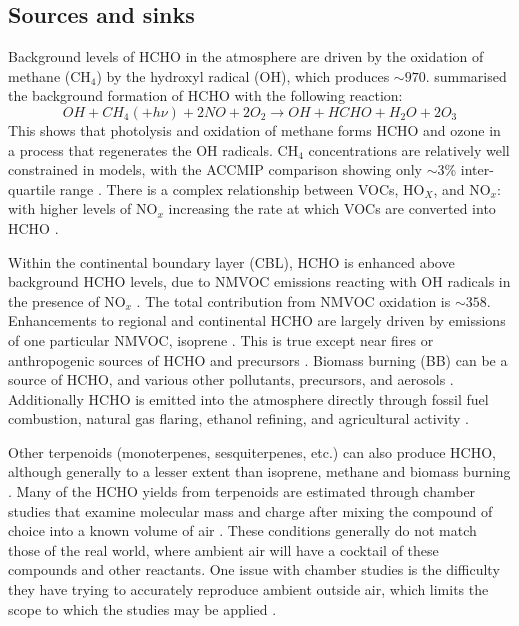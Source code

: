   
  \subsection{Sources and sinks}
    \label{LR:HCHO:Sources}
     
    Background levels of HCHO in the atmosphere are driven by the oxidation of methane (CH$_4$) by the hydroxyl radical (OH$\dot{}$), which produces $\sim 970$\tgpyr \parencite{FortemsCheiney2012}.
    \textcite{Atkinson2000} summarised the background formation of HCHO with the following reaction:
    \begin{equation*} \label{LR:HCHO:Sources:eqn_MethaneBackground}
      OH + CH_4 (+ h\nu) + 2NO + 2O_2 \rightarrow OH + HCHO + H_2O + 2O_3
    \end{equation*}
    This shows that photolysis and oxidation of methane forms HCHO and ozone in a process that regenerates the OH radicals.
    CH$_4$ concentrations are relatively well constrained in models, with the ACCMIP comparison showing only $\sim3$\% inter-quartile range \parencite{Young2013}.
    There is a complex relationship between VOCs, HO$_X$, and NO$_x$: with higher levels of NO$_x$ increasing the rate at which VOCs are converted into HCHO \parencite{Wolfe2016}.
    
    Within the continental boundary layer (CBL), HCHO is enhanced above background HCHO levels, due to NMVOC emissions reacting with OH radicals in the presence of NO$_x$ \parencite{Wagner2002, Millet2006, Kefauver2014}.
    The total contribution from NMVOC oxidation is $\sim 358$\tgpyr \parencite{FortemsCheiney2012}.
    Enhancements to regional and continental HCHO are largely driven by emissions of one particular NMVOC, isoprene \parencite{Guenther1995,Palmer2003, Shim2005, Kefauver2014}.
    This is true except near fires or anthropogenic sources of HCHO and precursors \parencite{Guenther1995, Kefauver2014, Wolfe2016}.
    Biomass burning (BB) can be a source of HCHO, and various other pollutants, precursors, and aerosols \parencite{Guenther1995, Andreae2001}.
    Additionally HCHO is emitted into the atmosphere directly through fossil fuel combustion, natural gas flaring, ethanol refining, and agricultural activity \parencite{Wolfe2016}.
    
    Other terpenoids (monoterpenes, sesquiterpenes, etc.) can also produce HCHO, although generally to a lesser extent than isoprene, methane and biomass burning \parencite{Guenther2012}.
    Many of the HCHO yields from terpenoids are estimated through chamber studies that examine molecular mass and charge after mixing the compound of choice into a known volume of air \parencite[eg.][]{Nguyen2014}.
    These conditions generally do not match those of the real world, where ambient air will have a cocktail of these compounds and other reactants.
    One issue with chamber studies is the difficulty they have trying to accurately reproduce ambient outside air, which limits the scope to which the studies may be applied \parencite{Nguyen2014}.
    
